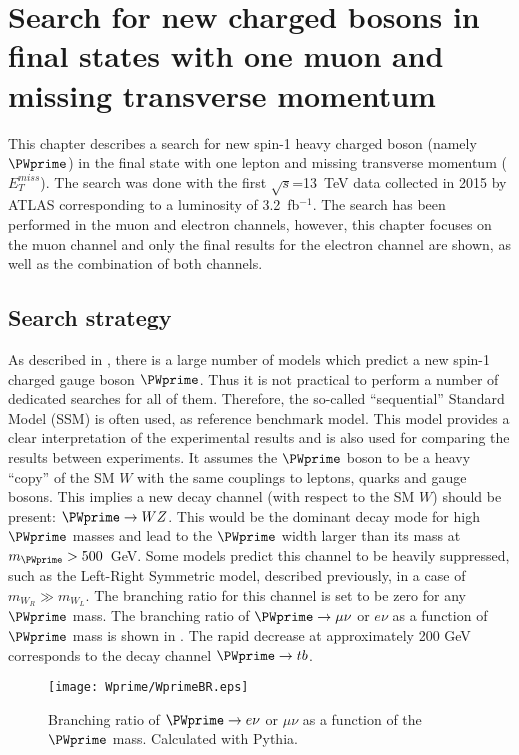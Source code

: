 \chapter{Search for new charged bosons in final states with one muon and missing transverse momentum}
\label{chap:Wprime}



This chapter describes a search for new spin-1 heavy charged boson (namely $\PWprime$) in the final state with one lepton and missing transverse momentum ($E_T^{miss}$).
The search was done with the first $\sqrt{s}$=13~TeV data collected in 2015 by ATLAS corresponding to a luminosity of 3.2~fb$^{-1}$. The search has been performed in the muon and electron channels, however, this chapter focuses on the muon channel and only the final results for the electron channel are shown, as well as the combination of both channels.



\section{Search strategy}
\label{sec:wprimeIntro} 

As described in , there is a large number of models
which predict a new spin-1 charged gauge boson $\PWprime$. Thus it is not practical to perform a number of dedicated searches for all of them. Therefore, the so-called ``sequential'' Standard Model (SSM) is often used, as reference benchmark model.
This model provides a clear interpretation of the experimental results and
is also used for comparing the results between experiments.
It assumes the $\PWprime$ boson to be a heavy ``copy'' of the SM $W$ with the same couplings to leptons, quarks and gauge bosons. 
This implies a new decay channel (with respect to the SM $W$)
should be present: $\PWprime \to WZ$. This would be the dominant decay mode 
for high $\PWprime$ masses and lead to the $\PWprime$ width larger
than its mass at  $m_{\PWprime} > 500$~GeV. 
Some models predict this channel to be heavily suppressed, 
such as the Left-Right Symmetric model, described previously, in a case of $m_{W_R} \gg m_{W_L}$.
The branching ratio for this channel is set to be zero for any $\PWprime$ mass.
The branching ratio of $\PWprime \to \mu\nu$ or $e\nu$ as a function of $\PWprime$ mass
is shown in . The rapid decrease at approximately 200 GeV corresponds to the decay channel $\PWprime \to tb$.
\begin{figure}[!htb]
  \centering
  \texttt{[image: Wprime/WprimeBR.eps]}
  \caption{Branching ratio of $\PWprime \rightarrow e\nu$ or $\mu\nu$ as a function of the $\PWprime$ mass. Calculated with Pythia.}
  \label{fig:wprimeBR}
\end{figure}

